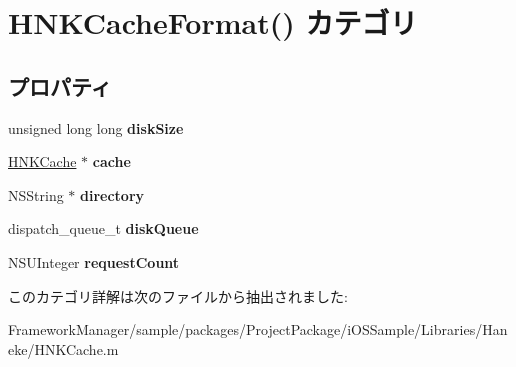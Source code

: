 \hypertarget{category_h_n_k_cache_format_07_08}{}\section{H\+N\+K\+Cache\+Format() カテゴリ}
\label{category_h_n_k_cache_format_07_08}
\subsection*{プロパティ}
\begin{DoxyCompactItemize}
\item 
\hypertarget{category_h_n_k_cache_format_07_08_a3410eb7616b250564022bd25744d63cc}{}unsigned long long {\bfseries disk\+Size}\label{category_h_n_k_cache_format_07_08_a3410eb7616b250564022bd25744d63cc}

\item 
\hypertarget{category_h_n_k_cache_format_07_08_ab204922e712f7542cae1d367e5c492d1}{}\hyperlink{interface_h_n_k_cache}{H\+N\+K\+Cache} $\ast$ {\bfseries cache}\label{category_h_n_k_cache_format_07_08_ab204922e712f7542cae1d367e5c492d1}

\item 
\hypertarget{category_h_n_k_cache_format_07_08_a5a44c83fd68a2d7e8c36f46f3cf30001}{}N\+S\+String $\ast$ {\bfseries directory}\label{category_h_n_k_cache_format_07_08_a5a44c83fd68a2d7e8c36f46f3cf30001}

\item 
\hypertarget{category_h_n_k_cache_format_07_08_a27476d53f0d7a6a126df02a48c0bd2e5}{}dispatch\+\_\+queue\+\_\+t {\bfseries disk\+Queue}\label{category_h_n_k_cache_format_07_08_a27476d53f0d7a6a126df02a48c0bd2e5}

\item 
\hypertarget{category_h_n_k_cache_format_07_08_a50e6c095137f03142ca81769f4d94970}{}N\+S\+U\+Integer {\bfseries request\+Count}\label{category_h_n_k_cache_format_07_08_a50e6c095137f03142ca81769f4d94970}

\end{DoxyCompactItemize}


このカテゴリ詳解は次のファイルから抽出されました\+:\begin{DoxyCompactItemize}
\item 
Framework\+Manager/sample/packages/\+Project\+Package/i\+O\+S\+Sample/\+Libraries/\+Haneke/H\+N\+K\+Cache.\+m\end{DoxyCompactItemize}
